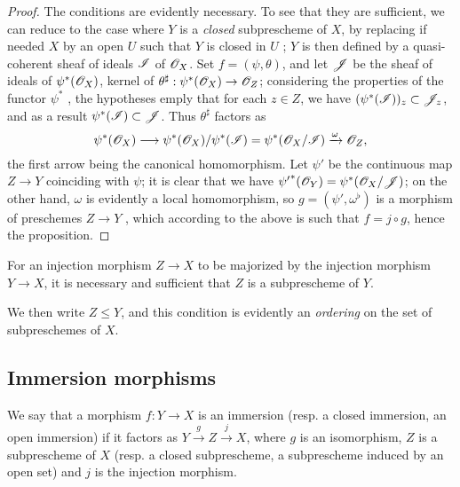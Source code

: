 \begin{proof}
\label{proof-1.4.1.9}
The conditions are evidently necessary.
To see that they are sufficient, we can reduce to the case where $Y$ is a \emph{closed} subprescheme of $X$, by replacing if needed $X$ by an open $U$ such that $Y$ is closed in $U$ ; $Y$ is then defined by a quasi-coherent sheaf of ideals $\mathscr{I}$ of $\mathscr{O}_X$.
Set $f=(\psi,\theta)$, and let $\mathscr{J}$ be the sheaf of ideals of $\psi^*(\mathscr{O}_X)$, kernel of $\theta^\sharp:\psi^*(\mathscr{O}_X)\to\mathscr{O}_Z$; considering the properties of the functor $\psi^*$ , the hypotheses emply that for each $z\in Z$, we have $(\psi^*(\mathscr{I}))_z\subset\mathscr{J}_z$, and as a result $\psi^*(\mathscr{I})\subset\mathscr{J}$.
Thus $\theta^\sharp$ factors as
\[
  \psi^*(\mathscr{O}_X)\longrightarrow\psi^*(\mathscr{O}_X)/\psi^*(\mathscr{I})=\psi^*(\mathscr{O}_X/\mathscr{I})\xrightarrow{\omega}\mathscr{O}_Z,
\]
the first arrow being the canonical homomorphism.
Let $\psi'$ be the continuous map $Z\to Y$ coinciding with $\psi$; it is clear that we have ${\psi'}^*(\mathscr{O}_Y)=\psi^*(\mathscr{O}_X/\mathscr{J})$; on the other hand, $\omega$ is evidently a local homomorphism, so $g=(\psi',\omega^\flat)$ is a morphism
of preschemes $Z\to Y$ , which according to the above is such that $f=j\circ g$, hence the proposition.
\end{proof}

\begin{cor}[4.1.10]
\label{1.4.1.10}
For an injection morphism $Z\to X$ to be majorized by the injection morphism $Y\to X$, it is necessary and sufficient that $Z$ is a subprescheme of $Y$.
\end{cor}

We then write $Z\leqslant Y$, and this condition is evidently an \emph{ordering} on the set of subpreschemes of $X$.

\subsection{Immersion morphisms}
\label{subsection-immersion-morphisms}

\begin{defn}[4.2.1]
\label{1.4.2.1}
We say that a morphism $f:Y\to X$ is an immersion (resp. a closed immersion, an open immersion) if it factors as $Y\xrightarrow{g}Z\xrightarrow{j}X$, where $g$ is an isomorphism, $Z$ is a subprescheme of $X$ (resp. a closed subprescheme, a subprescheme induced by an open set) and $j$ is the injection morphism.
\end{defn}

